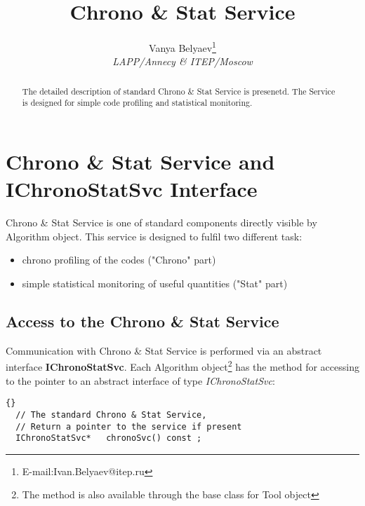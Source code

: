\documentclass{lhcbnote}
\newcommand{\bftt}         {\ttfamily\bfseries}
\renewcommand{\it}         {\itshape}
\renewcommand{\tt}         {\ttfamily}
\begin{document}
\lstset{language=[ANSI]C++}
\lstset{indent=15mm}
\lstset{labelstep=1}
\lstset{labelstyle=\tt\tiny}

\docmod{\today}



\title{Chrono \& Stat Service}
\author{Vanya Belyaev\footnote{E-mail:{\tt Ivan.Belyaev@itep.ru}} \\
  {\it LAPP/Annecy \& ITEP/Moscow}}
\maketitle

\begin{abstract}
The detailed description of standard Chrono \& Stat Service
is presenetd. The Service is designed for simple code profiling
and statistical monitoring.
\end{abstract}

\tableofcontents

\chapter{Chrono \& Stat Service and {\bftt{IChronoStatSvc}}  Interface}

Chrono \& Stat Service is one of standard components directly
visible by Algorithm object.
This service is designed to fulfil two different task:

\begin{itemize}
 \item chrono profiling  of  the  codes  ("Chrono" part)
 \item simple statistical monitoring of useful quantities ("Stat" part)
\end{itemize}

\section{Access to the Chrono \& Stat Service}
Communication with Chrono \& Stat Service is performed via an
abstract  interface {\bftt{IChronoStatSvc}}.
Each Algorithm object\footnote{The method is also available
  through the base class {\tt{GaudiTool}} for Tool object}  has the
method for accessing to the pointer to an abstract interface of type
{\it IChronoStatSvc}:

\begin{lstlisting}{}
  // The standard Chrono & Stat Service,
  // Return a pointer to the service if present
  IChronoStatSvc*   chronoSvc() const ;
\end{lstlisting}
\end{document}
